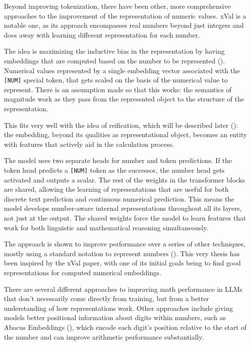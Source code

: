 \documentclass[
  a4paper, twoside, 10pt, titlepage]{book}
\begin{document}
Beyond improving tokenization, there have been other, more comprehensive
approaches to the improvement of the representation of numeric values.
xVal is a notable one, as its approach encompasses real numbers beyond
just integers and does away with learning different representation for
each number.

The idea is maximizing the inductive bias in the representation by
having embeddings that are computed based on the number to be
represented (). Numerical
values represented by a single embedding vector associated with the
\texttt{{[}NUM{]}} special token, that gets scaled on the basis of the
numerical value to represent. There is an assumption made so that this
works: the semantics of magnitude work as they pass from the represented
object to the structure of the representation.

This fits very well with the idea of reification, which will be
described later (): the
embedding, beyond its qualities as representational object, becomes an
entity with features that actively aid in the calculation process.

The model uses two separate heads for number and token predictions. If
the token head predicts a \texttt{{[}NUM{]}} token as the successor, the
number head gets activated and outputs a scalar. The rest of the weights
in the transformer blocks are shared, allowing the learning of
representations that are useful for both discrete text prediction and
continuous numerical prediction. This means the model develops
number-aware internal representations throughout all its layers, not
just at the output. The shared weights force the model to learn features
that work for both linguistic and mathematical reasoning simultaneously.

The approach is shown to improve performance over a series of other
techniques, mostly using a standard notation to represent numbers
(). This very thesis has
been inspired by the xVal paper, with one of its initial goals being to
find good representations for computed numerical embeddings.

There are several different approaches to improving math performance in
LLMs that don't necessarily come directly from training, but from a
better understanding of how representations work. Other approaches
include giving models better positional information about digits within
numbers, such as Abacus Embeddings (), which encode each digit's position relative to the start
of the number and can improve arithmetic performance substantially.
\end{document}
